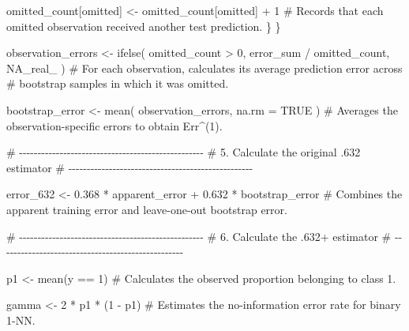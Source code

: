 \documentclass[
  letterpaper,
  DIV=11,
  numbers=noendperiod]{scrreprt}
\newenvironment{Shaded}{\begin{snugshade}}{\end{snugshade}}
\newcommand{\AttributeTok}[1]{\textcolor[rgb]{0.40,0.45,0.13}{#1}}
\newcommand{\CommentTok}[1]{\textcolor[rgb]{0.37,0.37,0.37}{#1}}
\newcommand{\ConstantTok}[1]{\textcolor[rgb]{0.56,0.35,0.01}{#1}}
\newcommand{\DecValTok}[1]{\textcolor[rgb]{0.68,0.00,0.00}{#1}}
\newcommand{\FloatTok}[1]{\textcolor[rgb]{0.68,0.00,0.00}{#1}}
\newcommand{\FunctionTok}[1]{\textcolor[rgb]{0.28,0.35,0.67}{#1}}
\newcommand{\NormalTok}[1]{\textcolor[rgb]{0.00,0.23,0.31}{#1}}
\newcommand{\OtherTok}[1]{\textcolor[rgb]{0.00,0.23,0.31}{#1}}
\newcommand{\SpecialCharTok}[1]{\textcolor[rgb]{0.37,0.37,0.37}{#1}}
\begin{document}
\begin{Shaded}
\begin{Highlighting}[]
\NormalTok{      omitted\_count[omitted] }\OtherTok{\textless{}{-}}
\NormalTok{        omitted\_count[omitted] }\SpecialCharTok{+} \DecValTok{1}
      \CommentTok{\# Records that each omitted observation received another test prediction.}
\NormalTok{    \}}
\NormalTok{  \}}

\NormalTok{  observation\_errors }\OtherTok{\textless{}{-}} \FunctionTok{ifelse}\NormalTok{(}
\NormalTok{    omitted\_count }\SpecialCharTok{\textgreater{}} \DecValTok{0}\NormalTok{,}
\NormalTok{    error\_sum }\SpecialCharTok{/}\NormalTok{ omitted\_count,}
    \ConstantTok{NA\_real\_}
\NormalTok{  )}
  \CommentTok{\# For each observation, calculates its average prediction error across}
  \CommentTok{\# bootstrap samples in which it was omitted.}

\NormalTok{  bootstrap\_error }\OtherTok{\textless{}{-}} \FunctionTok{mean}\NormalTok{(}
\NormalTok{    observation\_errors,}
    \AttributeTok{na.rm =} \ConstantTok{TRUE}
\NormalTok{  )}
  \CommentTok{\# Averages the observation{-}specific errors to obtain Err\^{}(1).}


  \CommentTok{\# {-}{-}{-}{-}{-}{-}{-}{-}{-}{-}{-}{-}{-}{-}{-}{-}{-}{-}{-}{-}{-}{-}{-}{-}{-}{-}{-}{-}{-}{-}{-}{-}{-}{-}{-}{-}{-}{-}{-}{-}{-}{-}{-}{-}{-}{-}{-}{-}{-}{-}}
  \CommentTok{\# 5. Calculate the original .632 estimator}
  \CommentTok{\# {-}{-}{-}{-}{-}{-}{-}{-}{-}{-}{-}{-}{-}{-}{-}{-}{-}{-}{-}{-}{-}{-}{-}{-}{-}{-}{-}{-}{-}{-}{-}{-}{-}{-}{-}{-}{-}{-}{-}{-}{-}{-}{-}{-}{-}{-}{-}{-}{-}{-}}

\NormalTok{  error\_632 }\OtherTok{\textless{}{-}}
    \FloatTok{0.368} \SpecialCharTok{*}\NormalTok{ apparent\_error }\SpecialCharTok{+}
    \FloatTok{0.632} \SpecialCharTok{*}\NormalTok{ bootstrap\_error}
  \CommentTok{\# Combines the apparent training error and leave{-}one{-}out bootstrap error.}


  \CommentTok{\# {-}{-}{-}{-}{-}{-}{-}{-}{-}{-}{-}{-}{-}{-}{-}{-}{-}{-}{-}{-}{-}{-}{-}{-}{-}{-}{-}{-}{-}{-}{-}{-}{-}{-}{-}{-}{-}{-}{-}{-}{-}{-}{-}{-}{-}{-}{-}{-}{-}{-}}
  \CommentTok{\# 6. Calculate the .632+ estimator}
  \CommentTok{\# {-}{-}{-}{-}{-}{-}{-}{-}{-}{-}{-}{-}{-}{-}{-}{-}{-}{-}{-}{-}{-}{-}{-}{-}{-}{-}{-}{-}{-}{-}{-}{-}{-}{-}{-}{-}{-}{-}{-}{-}{-}{-}{-}{-}{-}{-}{-}{-}{-}{-}}

\NormalTok{  p1 }\OtherTok{\textless{}{-}} \FunctionTok{mean}\NormalTok{(y }\SpecialCharTok{==} \DecValTok{1}\NormalTok{)}
  \CommentTok{\# Calculates the observed proportion belonging to class 1.}
  
\NormalTok{  gamma }\OtherTok{\textless{}{-}} \DecValTok{2} \SpecialCharTok{*}\NormalTok{ p1 }\SpecialCharTok{*}\NormalTok{ (}\DecValTok{1} \SpecialCharTok{{-}}\NormalTok{ p1)}
  \CommentTok{\# Estimates the no{-}information error rate for binary 1{-}NN.}
  

\end{Highlighting}
\end{Shaded}
\end{document}
